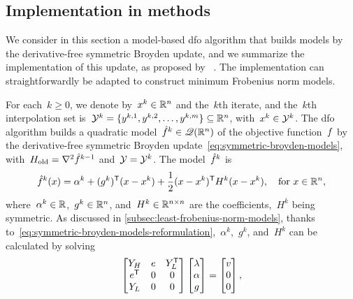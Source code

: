 \subsection{Implementation in  methods}
\label{subsec:implementation-symmetric-broyden-update}

We consider in this section a model-based \gls{dfo} algorithm that builds models by the derivative-free symmetric Broyden update, and we summarize the implementation of this update, as proposed by \citeauthor{Powell_2004b}~\cite{Powell_2004b,Powell_2004c}.
The implementation can straightforwardly be adapted to construct minimum Frobenius norm models.

For each~$k \ge 0$, we denote by~$\iter[k] \in \R^n$ and the~$k$th iterate, and the~$k$th interpolation set is~$\xpt[k] = \set{y^{k, 1}, y^{k, 2}, \dots, y^{k, m}} \subseteq \R^n$, with~$\iter[k] \in \xpt[k]$.
The \gls{dfo} algorithm builds a quadratic model~$\objm[k] \in \qpoly$ of the objective function~$f$ by the derivative-free symmetric Broyden update~\cref{eq:symmetric-broyden-models}, with~$H_{\text{old}} = \nabla^2 \objm[k - 1]$ and~$\xpt = \xpt[k]$.
The model~$\objm[k]$ is
\begin{equation*}
    \objm[k](\iter) = \alpha^k + (g^k)^{\T} (\iter - \iter[k]) + \frac{1}{2} (\iter - \iter[k])^{\T} H^k (\iter - \iter[k]), \quad \text{for~$\iter \in \R^n$},
\end{equation*}
where~$\alpha^k \in \mathbb{R}$,~$g^k \in \mathbb{R}^n$, and~$H^k \in \mathbb{R}^{n \times n}$ are the coefficients,~$H^k$ being symmetric.
As discussed in \cref{subsec:least-frobenius-norm-models}, thanks to~\cref{eq:symmetric-broyden-models-reformulation},~$\alpha^k$,~$g^k$, and~$H^k$ can be calculated by solving
\begin{equation}
    \label{eq:least-frobenius-kkt-system-2}
    \begin{bmatrix}
        Y_H     & e & Y_L^{\T}\\
        e^{\T}  & 0 & 0\\
        Y_L     & 0 & 0
    \end{bmatrix}
    \begin{bmatrix}
        \lm\\
        \alpha\\
        g
    \end{bmatrix}
    =
    \begin{bmatrix}
        v\\
        0\\
        0
    \end{bmatrix},
\end{equation}

